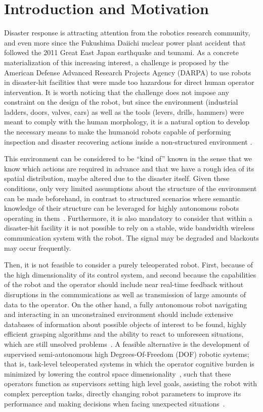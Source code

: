 \section{Introduction and Motivation}
	\label{sec:introduction}

	Disaster response is attracting attention from the robotics research community, and even more since the
	Fukushima Daiichi nuclear power plant accident that followed the 2011 Great East Japan earthquake and tsunami.
	As a concrete materialization of this increasing interest, a challenge is proposed by the American Defense
	Advanced Research Projects Agency (DARPA) to use robots in disaster-hit facilities that were made too hazardous
	for direct human operator intervention.
	It is worth noticing that the challenge does not impose any constraint on the design of the robot, but since the
	environment (industrial ladders, doors, valves, cars) as well as the tools (levers, drills, hammers) were meant
	to comply with the human morphology, it is a natural option to develop the necessary means to make the humanoid
	robots capable of performing inspection and disaster recovering actions inside a non-structured environment
	\cite{Bouyarmane}.
	
	This environment can be considered to be ``kind of'' known in the sense that we know which actions
	are required in advance and that we have a rough idea of its spatial distribution,
	maybe altered due to the disaster itself.
	Given these conditions, only very limited assumptions about the structure of the environment can
	be made beforehand, in contrast to structured scenarios where semantic knowledge of their structure
	can be leveraged for highly autonomous robots operating in them~\cite{Kohlbrecher}.
	Furthermore, it is also mandatory to consider that within a disaster-hit facility it is not possible
	to rely on a stable, wide bandwidth wireless communication system with the robot.
	The signal may be degraded and blackouts may occur frequently.
	
	Then, it is not feasible to consider a purely teleoperated robot.
	First, because of the high dimensionality of its control system, and second because the capabilities of
	the robot and the operator should include near real-time feedback without disruptions in the communications
	as well as transmission of large amounts of data to the operator.
	On the other hand, a fully autonomous robot navigating and interacting in an unconstrained environment
	should include extensive databases of information about possible objects of interest to be found,
	highly efficient grasping algorithms and the ability to react to unforeseen situations,
	which are still unsolved problems~\cite{Romay}.
	A feasible alternative is the development of supervised semi-autonomous high Degrees-Of-Freedom (DOF)
	robotic systems; that is, task-level teleoperated systems in which the operator cognitive burden is
	minimized by lowering the control space dimensionality~\cite{Katyal}, such that these operators function
	as supervisors setting high level goals, assisting the robot with complex perception tasks, directly
	changing robot parameters to improve its performance and making decisions when facing unexpected
	situations~\cite{Kohlbrecher}.